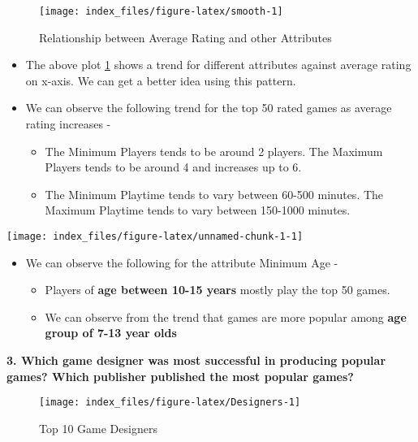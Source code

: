 \documentclass[
]{article}
\providecommand{\tightlist}{%
  \setlength{\itemsep}{0pt}\setlength{\parskip}{0pt}}
\begin{document}
\begin{figure}[H]

{\centering \texttt{[image: index\_files/figure-latex/smooth-1]} 

}

\caption{Relationship between Average Rating and other Attributes}\label{fig:smooth}
\end{figure}

\begin{itemize}
\item
  The above plot \ref{fig:smooth} shows a trend for different attributes against average rating on x-axis. We can get a better idea using this pattern.
\item
  We can observe the following trend for the top 50 rated games as average rating increases -

  \begin{itemize}
  \tightlist
  \item
    The Minimum Players tends to be around 2 players. The Maximum Players tends to be around 4 and increases up to 6.
  \item
    The Minimum Playtime tends to vary between 60-500 minutes. The Maximum Playtime tends to vary between 150-1000 minutes.
  \end{itemize}
\end{itemize}

\begin{center}\texttt{[image: index\_files/figure-latex/unnamed-chunk-1-1]} \end{center}

\begin{itemize}
\item
  We can observe the following for the attribute Minimum Age -

  \begin{itemize}
  \tightlist
  \item
    Players of \textbf{age between 10-15 years} mostly play the top 50 games.
  \item
    We can observe from the trend that games are more popular among \textbf{age group of 7-13 year olds}
  \end{itemize}
\end{itemize}

\textbf{3. Which game designer was most successful in producing popular games? Which publisher published the most popular games?}

\begin{figure}[H]

{\centering \texttt{[image: index\_files/figure-latex/Designers-1]} 

}

\caption{Top 10 Game Designers}\label{fig:Designers}
\end{figure}
\end{document}
